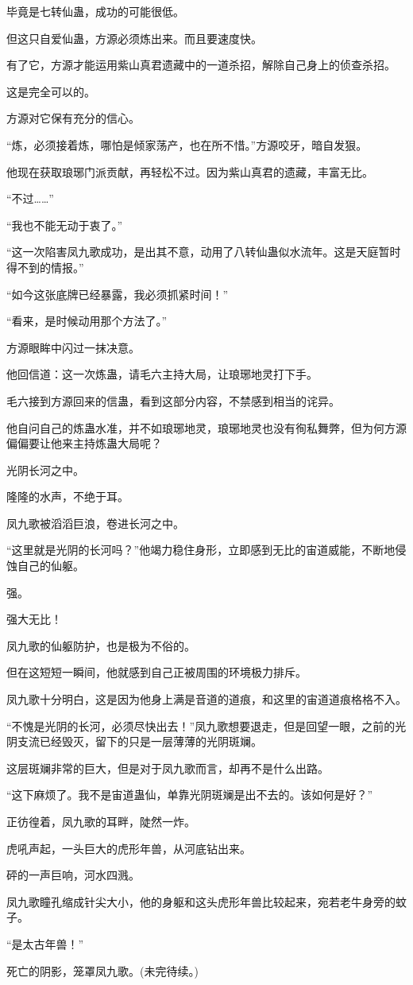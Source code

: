 \begin{this_body}
毕竟是七转仙蛊，成功的可能很低。

但这只自爱仙蛊，方源必须炼出来。而且要速度快。

有了它，方源才能运用紫山真君遗藏中的一道杀招，解除自己身上的侦查杀招。

这是完全可以的。

方源对它保有充分的信心。

“炼，必须接着炼，哪怕是倾家荡产，也在所不惜。”方源咬牙，暗自发狠。

他现在获取琅琊门派贡献，再轻松不过。因为紫山真君的遗藏，丰富无比。

“不过……”

“我也不能无动于衷了。”

“这一次陷害凤九歌成功，是出其不意，动用了八转仙蛊似水流年。这是天庭暂时得不到的情报。”

“如今这张底牌已经暴露，我必须抓紧时间！”

“看来，是时候动用那个方法了。”

方源眼眸中闪过一抹决意。

他回信道：这一次炼蛊，请毛六主持大局，让琅琊地灵打下手。

毛六接到方源回来的信蛊，看到这部分内容，不禁感到相当的诧异。

他自问自己的炼蛊水准，并不如琅琊地灵，琅琊地灵也没有徇私舞弊，但为何方源偏偏要让他来主持炼蛊大局呢？

光阴长河之中。

隆隆的水声，不绝于耳。

凤九歌被滔滔巨浪，卷进长河之中。

“这里就是光阴的长河吗？”他竭力稳住身形，立即感到无比的宙道威能，不断地侵蚀自己的仙躯。

强。

强大无比！

凤九歌的仙躯防护，也是极为不俗的。

但在这短短一瞬间，他就感到自己正被周围的环境极力排斥。

凤九歌十分明白，这是因为他身上满是音道的道痕，和这里的宙道道痕格格不入。

“不愧是光阴的长河，必须尽快出去！”凤九歌想要退走，但是回望一眼，之前的光阴支流已经毁灭，留下的只是一层薄薄的光阴斑斓。

这层斑斓非常的巨大，但是对于凤九歌而言，却再不是什么出路。

“这下麻烦了。我不是宙道蛊仙，单靠光阴斑斓是出不去的。该如何是好？”

正彷徨着，凤九歌的耳畔，陡然一炸。

虎吼声起，一头巨大的虎形年兽，从河底钻出来。

砰的一声巨响，河水四溅。

凤九歌瞳孔缩成针尖大小，他的身躯和这头虎形年兽比较起来，宛若老牛身旁的蚊子。

“是太古年兽！”

死亡的阴影，笼罩凤九歌。(未完待续。)

\end{this_body}


